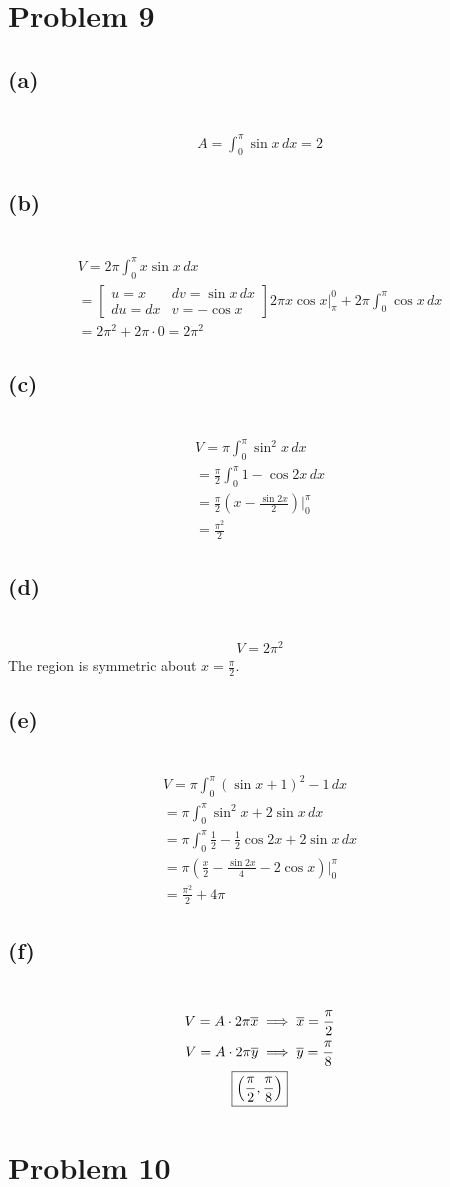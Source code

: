 \documentclass[12pt]{article}
\newcommand*{\paren}[1]{\ensuremath\left(#1\right)}
\newcommand{\at}{\Big|}
\newcommand{\vem}{\vspace{0.5em}}
\newcommand{\problem}[1]{\section{Problem #1}}
\newcommand{\subproblem}[1]{\subsection{(#1)} \,}
\begin{document}
\problem{9}

\subproblem{a}
\begin{gather*}
    A=\int_0^\pi \sin x \, dx = \boxed{2}    
\end{gather*}

\subproblem{b}
\begin{gather*}
    V=2\pi \int_0^\pi x\sin x\, dx\\
    =\begin{bmatrix}
        u=x & dv=\sin x\, dx\\
        du=dx & v=-\cos x
    \end{bmatrix} 2\pi x\cos x \Big|_\pi ^0 +2\pi \int_0^\pi \cos x\, dx\\
    =2\pi^2 + 2\pi \cdot 0= \boxed{2\pi^2}
\end{gather*}

\subproblem{c}
\begin{gather*}
    V=\pi \int_0^\pi \sin ^2 x\, dx\\
    = \frac{\pi}{2} \int_0^\pi  1-\cos  2x\, dx\\
    =\frac{\pi }{2}(x-\frac{\sin 2x}{2})\Big|_0^\pi\\
    = \boxed{\frac{\pi^2}{2}}
\end{gather*}

\subproblem{d}
\begin{gather*}
    V=\boxed{2\pi^2}
\end{gather*}
The region is symmetric about $x=\frac{\pi}{2}$. \vem

\subproblem{e}
\begin{gather*}
    V=\pi \int_0^\pi (\sin x+1)^2-1\, dx\\
    =\pi \int_0^\pi \sin^2 x+2\sin x\,d x\\
    =\pi  \int_0^\pi  \frac{1}{2}-\frac{1}{2}\cos 2x+2\sin x \, dx\\
    =\pi (\frac{x}{2}-\frac{\sin 2x}{4}-2\cos x)\at _0^\pi\\
    =\boxed{\frac{\pi^2}{2}+4\pi}
\end{gather*}

\subproblem{f}
\begin{gather*}
    V=A\cdot 2\pi \overline{x} \implies \overline{x} = \frac{\pi}{2}\\
    V=A\cdot 2\pi \overline{y} \implies \overline{y}= \frac{\pi}{8}\\
    \boxed{\paren{\frac{\pi}{2},\frac{\pi}{8}}}
\end{gather*}

\problem{10}
\end{document}
